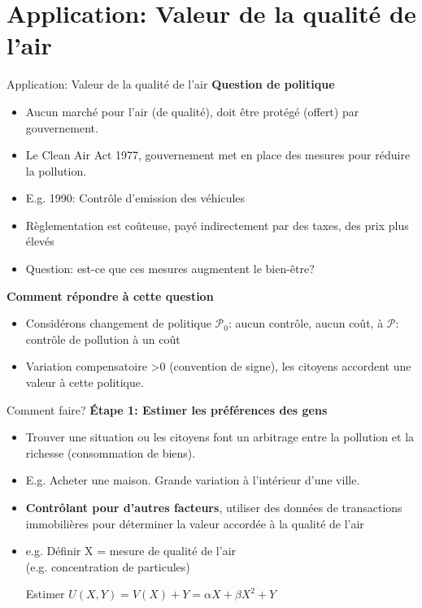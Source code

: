 \documentclass[handout]{beamer}
\newcommand{\mcl}{\mathcal}
\newenvironment{iPar}[1]{\textbf{#1} \begin{itemize}}{\end{itemize}}
\newcommand{\mdp}{\medskip \pause}
\begin{document}
\section{Application: Valeur de la qualité de l'air}
\begin{frame}{Application: Valeur de la qualité de l'air }
\begin{iPar}{Question de politique}
\item Aucun marché pour l'air (de qualité), doit être protégé (offert) par gouvernement.
\item Le Clean Air Act 1977, gouvernement met en place des mesures pour réduire la pollution.
\item E.g. 1990: Contrôle d'emission des véhicules
\item Règlementation est coûteuse, payé indirectement par des taxes, des prix plus élevés
\item Question: est-ce que ces mesures augmentent le bien-être?
\end{iPar}\mdp

\begin{iPar}{Comment répondre à cette question}
\item Considérons changement de politique $\mcl P_0$: aucun contrôle, aucun coût, à $\mcl P$: contrôle de pollution à un coût
\item Variation compensatoire >0 (convention de signe), les citoyens accordent une valeur à cette politique.
\end{iPar}
\end{frame}


\begin{frame}{Comment faire?}
\begin{iPar}{Étape 1: Estimer les préférences des gens}
\item Trouver une situation ou les citoyens font un arbitrage entre la pollution et la richesse (consommation de biens).
\item E.g. Acheter une maison. Grande variation à l'intérieur d'une ville.\mdp
\item \textbf{Contrôlant pour d'autres facteurs}, utiliser des données de transactions immobilières pour déterminer la valeur accordée à la qualité de l'air
\item e.g. Définir X = mesure de qualité de l'air \\ (e.g. concentration de particules) \pause

Estimer $U(X, Y) = V(X) + Y = \alpha X + \beta X^2 +Y$

\end{iPar}\mdp 

\end{frame}
\end{document}
